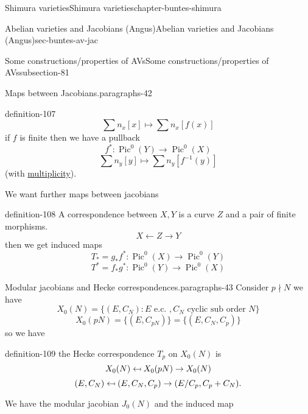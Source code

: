 \documentclass[oneside,10pt,]{book}
\numberwithin{equation}{section}
\newcommand{\inv}{^{-1}}
\providecommand\mapsfrom{\mathrel{\reflectbox{\ensuremath{\mapsto}}}}
\DeclareMathOperator{\Pic}{Pic}
\begin{document}
\begin{chapterptx}{Shimura varieties}{}{Shimura varieties}{}{}{chapter-buntes-shimura}
\begin{sectionptx}{Abelian varieties and Jacobians (Angus)}{}{Abelian varieties and Jacobians (Angus)}{}{}{sec-buntes-av-jac}
\begin{subsectionptx}{Some constructions/properties of AVs}{}{Some constructions/properties of AVs}{}{}{subsection-81}
\begin{paragraphs}{Maps between Jacobians.}{paragraphs-42}
\begin{definition}{}{definition-107}
%
\begin{equation*}
\sum n_x [x] \mapsto \sum n_x[f(x)]
\end{equation*}
if \(f\) is finite then we have  a pullback%
\begin{equation*}
f^* \colon \Pic^0(Y) \to \Pic^0(X)
\end{equation*}
%
\begin{equation*}
\sum n_y[y] \mapsto \sum n_y [f\inv (y)]
\end{equation*}
(with \hyperref[def-riem-order-vanish]{multiplicity}).%
\end{definition}
\hypertarget{p-1117}{}%
We want further maps between jacobians%
\begin{definition}{}{definition-108}%
\hypertarget{p-1118}{}%
A correspondence between \(X,Y\) is a curve \(Z\) and a pair of finite morphisms.%
\begin{equation*}
X \leftarrow Z \to Y
\end{equation*}
then we get induced maps%
\begin{equation*}
T_* = g_* f^* \colon \Pic^0(X) \to \Pic^0(Y)
\end{equation*}
%
\begin{equation*}
T^* = f_* g^* \colon \Pic^0(Y) \to \Pic^0(X)
\end{equation*}
%
\end{definition}
\end{paragraphs}%
\begin{paragraphs}{Modular jacobians and Hecke correspondences.}{paragraphs-43}%
\hypertarget{p-1119}{}%
Consider \(p\nmid N\) we have%
\begin{equation*}
X_0(N) = \{ (E,C_N) : E\text{ e.c. }, C_N \text{ cyclic sub order } N\}
\end{equation*}
%
\begin{equation*}
X_0(pN) = \{(E,C_{pN})\} = \{(E,C_N,C_p)\}
\end{equation*}
so we have%
\begin{definition}{}{definition-109}%
\hypertarget{p-1120}{}%
the Hecke correspondence \(T_p\) on \(X_0(N)\) is%
\begin{equation*}
X_0(N) \mapsfrom X_0(pN) \to X_0(N)
\end{equation*}
%
\begin{equation*}
(E,C_N)\mapsfrom (E,C_N,C_p)\to (E/C_p, C_p + C_N)\text{.}
\end{equation*}
%
\end{definition}
\hypertarget{p-1121}{}%
We have the modular jacobian \(J_0(N)\) and the induced map%

\end{paragraphs}
\end{subsectionptx}
\end{sectionptx}
\end{chapterptx}
\end{document}
